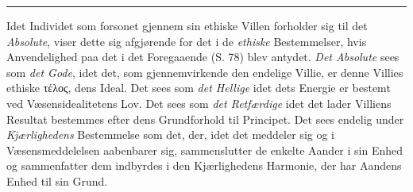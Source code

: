 \begin{center}\rule{2cm}{0.4pt}\end{center}

Idet Individet som forsonet gjennem sin ethiske Villen forholder sig til det
\emph{Absolute}, viser dette sig afgjørende for det i de \emph{ethiske}
Bestemmelser, hvis Anvendelighed paa det i det Foregaaende (S. 78) blev antydet.
\emph{Det Absolute} sees som \emph{det Gode}, idet det, som gjennemvirkende den
endelige Villie, er denne Villies ethiske τέλος, dens Ideal. Det sees som
\emph{det Hellige} idet dets Energie er bestemt ved Væsensidealitetens Lov. Det
sees som \emph{det Retfærdige} idet det lader Villiens Resultat bestemmes efter
dens Grundforhold til Principet. Det sees endelig under \emph{Kjærlighedens}
Bestemmelse som det, der, idet det meddeler sig og i Væsensmeddelelsen aabenbarer
sig, sammenslutter de enkelte Aander i sin Enhed og sammenfatter dem indbyrdes i
den Kjærlighedens Harmonie, der har Aandens Enhed til sin Grund.


